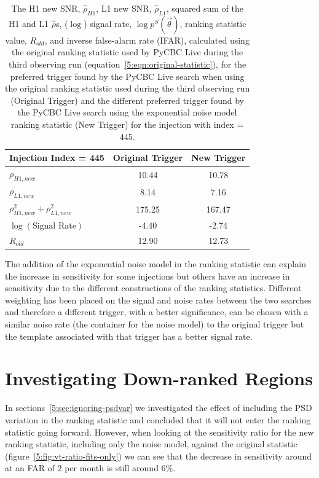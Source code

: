 \begin{table}[ht]
    \centering
    \begin{tabular}{lcc}
        \toprule
        \textbf{Injection Index = 445} & \textbf{Original Trigger} & \textbf{New Trigger} \\
        \midrule
        $\rho_{H1,new}$  & 10.44 & 10.78 \\
        $\rho_{L1,new}$   & 8.14 & 7.16 \\
        $\rho_{H1,new}^2 + \rho_{L1,new}^2$   & 175.25 & 167.47 \\
        $\log\left(\text{Signal Rate}\right)$ & -4.40 & -2.74 \\
        $R_{old}$ & 12.90 & 12.73 \\
        \bottomrule
    \end{tabular}
    \caption{The H1 new SNR, $\hat{\rho}_{H1}$, L1 new SNR, $\hat{\rho}_{L1}$, squared sum of the H1 and L1 $\hat{\rho}$s, ($\log$) signal rate, $\log p^{S}(\Vec{\theta})$, ranking statistic value, $R_{old}$, and inverse false-alarm rate (IFAR), calculated using the original ranking statistic used by PyCBC Live during the third observing run (equation~\ref{5:eqn:original-statistic}), for the preferred trigger found by the PyCBC Live search when using the original ranking statistic used during the third observing run (Original Trigger) and the different preferred trigger found by the PyCBC Live search using the exponential noise model ranking statistic (New Trigger) for the injection with index = 445.}
    \label{5:tab:445-old-stat}
\end{table}
%

The addition of the exponential noise model in the ranking statistic can explain the increase in sensitivity for some injections but others have an increase in sensitivity due to the different constructions of the ranking statistics. Different weighting has been placed on the signal and noise rates between the two searches and therefore a different trigger, with a better significance, can be chosen with a similar noise rate (the container for the noise model) to the original trigger but the template associated with that trigger has a better signal rate.

\section{\label{5:sec:investigating-regions}Investigating Down-ranked Regions}

In sections~\ref{5:sec:ignoring-psdvar} we investigated the effect of including the PSD variation in the ranking statistic and concluded that it will not enter the ranking statistic going forward. However, when looking at the sensitivity ratio for the new ranking statistic, including only the noise model, against the original statistic (figure~\ref{5:fig:vt-ratio-fits-only}) we can see that the decrease in sensitivity around at an FAR of $2$ per month is still around $6\%$.

